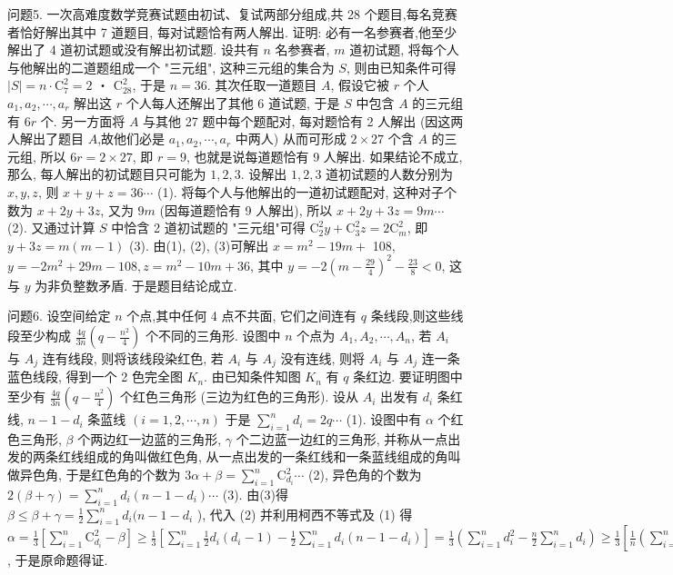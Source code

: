 问题5. 一次高难度数学竞赛试题由初试、复试两部分组成,共 28 个题目,每名竞赛者恰好解出其中 7 道题目, 每对试题恰有两人解出.
证明: 必有一名参赛者,他至少解出了 4 道初试题或没有解出初试题.
设共有 $n$ 名参赛者, $m$ 道初试题, 将每个人与他解出的二道题组成一个 "三元组", 这种三元组的集合为 $S$, 则由已知条件可得 $|S|=n \cdot \mathrm{C}_7^2=2$ ・ $\mathrm{C}_{28}^2$, 于是 $n=36$. 
其次任取一道题目 $A$, 假设它被 $r$ 个人 $a_1, a_2, \cdots, a_r$ 解出这 $r$ 个人每人还解出了其他 6 道试题, 于是 $S$ 中包含 $A$ 的三元组有 $6 r$ 个.
另一方面将 $A$ 与其他 27 题中每个题配对, 每对题恰有 2 人解出 (因这两人解出了题目 $A$,故他们必是 $a_1, a_2, \cdots, a_r$ 中两人) 从而可形成 $2 \times 27$ 个含 $A$ 的三元组, 所以 $6 r=2 \times 27$, 即 $r=9$, 也就是说每道题恰有 9 人解出.
如果结论不成立, 那么, 每人解出的初试题目只可能为 $1,2,3$. 设解出 $1,2,3$ 道初试题的人数分别为 $x, y, z$, 则 $x+y+z=36 \cdots$ (1). 
将每个人与他解出的一道初试题配对, 这种对子个数为 $x+2 y+3 z$, 又为 $9 m$ (因每道题恰有 9 人解出), 所以 $x+2 y+3 z=9 m \cdots$ (2). 
又通过计算 $S$ 中恰含 2 道初试题的 "三元组"可得 $\mathrm{C}_2^2 y+ \mathrm{C}_3^2 z=2 \mathrm{C}_m^2$, 即 $y+3 z=m(m-1)$ (3). 
由(1), (2), (3)可解出 $x=m^2-19 m+$ 108, $y=-2 m^2+29 m-108, z=m^2-10 m+36$, 其中 $y=-2\left(m-\frac{29}{4}\right)^2- \frac{23}{8}<0$, 这与 $y$ 为非负整数矛盾.
于是题目结论成立.



问题6. 设空间给定 $n$ 个点,其中任何 4 点不共面, 它们之间连有 $q$ 条线段,则这些线段至少构成 $\frac{4 q}{3 n}\left(q-\frac{n^2}{4}\right)$ 个不同的三角形.
设图中 $n$ 个点为 $A_1, A_2, \cdots, A_n$, 若 $A_i$ 与 $A_j$ 连有线段, 则将该线段染红色, 若 $A_i$ 与 $A_j$ 没有连线, 则将 $A_i$ 与 $A_j$ 连一条蓝色线段, 得到一个 2 色完全图 $K_n$. 由已知条件知图 $K_n$ 有 $q$ 条红边.
要证明图中至少有 $\frac{4 q}{3 n}\left(q-\frac{n^2}{4}\right)$ 个红色三角形 (三边为红色的三角形). 
设从 $A_i$ 出发有 $d_i$ 条红线, $n-1-d_i$ 条蓝线 $(i=1,2, \cdots, n)$ 于是 $\sum_{i=1}^n d_i=2 q \cdots$ (1). 
设图中有 $\alpha$ 个红色三角形, $\beta$ 个两边红一边蓝的三角形, $\gamma$ 个二边蓝一边红的三角形, 并称从一点出发的两条红线组成的角叫做红色角, 从一点出发的一条红线和一条蓝线组成的角叫做异色角, 于是红色角的个数为 $3 \alpha+\beta=\sum_{i=1}^n \mathrm{C}_{d_i}^2 \cdots$ (2), 
异色角的个数为 $2(\beta+\gamma)=\sum_{i=1}^n d_i\left(n-1-d_i\right) \cdots$ (3). 
由(3)得 $\beta \leqslant \beta+\gamma=\frac{1}{2} \sum_{i=1}^n d_i(n- 1-d_i$ ), 
代入 (2) 并利用柯西不等式及 (1) 得 $\alpha=\frac{1}{3}\left[\sum_{i=1}^n \mathrm{C}_{d_i}^2-\beta\right] \geqslant \frac{1}{3}\left[\sum_{i=1}^n \frac{1}{2} d_i\left(d_i-1\right)-\frac{1}{2} \sum_{i=1}^n d_i\left(n-1-d_i\right)\right]=\frac{1}{3}\left(\sum_{i=1}^n d_i^2-\frac{n}{2} \sum_{i=1}^n d_i\right) \geqslant \frac{1}{3}\left[\frac{1}{n}\left(\sum_{i=1}^n d_i\right)^2-\frac{n}{2} \sum_{i=1}^n d_i\right]=\frac{1}{3}\left[\frac{1}{n}(2 q)^2-\frac{n}{2}(2 q)\right]=\frac{4 q}{3 n}\left(q-\frac{n^2}{4}\right)$, 于是原命题得证.



